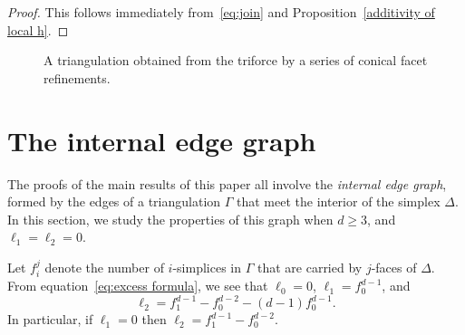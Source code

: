 \documentclass[ALCO,ThmDefs,Unicode,epreuves]{cedram}
\begin{document}
\begin{proof}
This follows immediately from~\eqref{eq:join} and Proposition~\ref{additivity of local h}.
\end{proof}

\begin{figure}[htb] \label{fig:conical-facet-refinement}
\centering
{} 

\caption{A triangulation obtained from the triforce by a series of conical facet refinements.}
\end{figure}




\section{The internal edge graph}

The proofs of the main results of this paper all involve the \emph{internal edge graph}, formed by the edges of a triangulation $\Gamma$ that meet the interior of the simplex $\Delta$. In this section, we study the properties of this graph when $d \geq 3$, and $\ell_1 = \ell_2 = 0$.

Let $f_i^j$ denote the number of $i$-simplices in $\Gamma$ that are carried by $j$-faces of $\Delta$. From equation~\eqref{eq:excess formula}, we see that $\ell_0 = 0$, $\ell_1 = f_0^{d-1}$, and
\begin{equation}\label{eqn:formula for l2}
\ell_2 = f_1^{d-1} -f_0^{d-2} - (d-1)f_0^{d-1}.
\end{equation}
In particular, if $\ell_1 = 0$ then $\ell_2 = f_1^{d-1} - f_0^{d-2}$.
\end{document}
